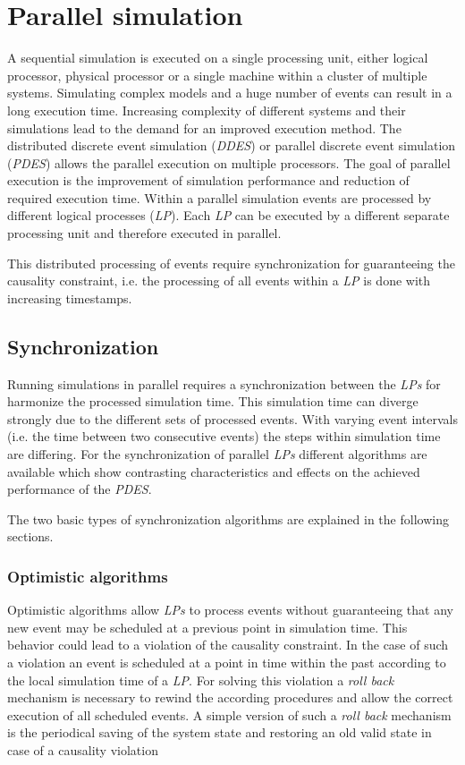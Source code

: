 \chapter{Parallel simulation}
\label{cha:parallel_sim}
A sequential simulation is executed on a single processing unit, either logical processor, physical processor or a single machine within a cluster of multiple systems.
Simulating complex models and a huge number of events can result in a long execution time.
Increasing complexity of different systems and their simulations lead to the demand for an improved execution method.
The distributed discrete event simulation (\emph{DDES}) or parallel discrete event simulation (\emph{PDES}) allows the parallel execution on multiple processors.
The goal of parallel execution is the improvement of simulation performance and reduction of required execution time.
Within a parallel simulation events are processed by different logical processes (\emph{LP}).
Each \emph{LP} can be executed by a different separate processing unit and therefore executed in parallel. \cite{bagrodia_parsec:_1998}

This distributed processing of events require synchronization for guaranteeing the causality constraint, i.e. the processing of all events within a \emph{LP} is done with increasing timestamps.

\section{Synchronization}
\label{sec:parallel_synchronization}
Running simulations in parallel requires a synchronization between the \emph{LPs} for harmonize the processed simulation time.
This simulation time can diverge strongly due to the different sets of processed events.
With varying event intervals (i.e. the time between two consecutive events) the steps within simulation time are differing.
For the synchronization of parallel \emph{LPs} different algorithms are available which show contrasting characteristics and effects on the achieved performance of the \emph{PDES}. \cite[chapter 2]{bagrodia_performance_2000}

The two basic types of synchronization algorithms are explained in the following sections.

\subsection{Optimistic algorithms}
\label{sec:parallel_synchronization_optimistic}
Optimistic algorithms allow \emph{LPs} to process events without guaranteeing that any new event may be scheduled at a previous point in simulation time.
This behavior could lead to a violation of the causality constraint.
In the case of such a violation an event is scheduled at a point in time within the past according to the local simulation time of a \emph{LP}.
For solving this violation a \emph{roll back} mechanism is necessary to rewind the according procedures and allow the correct execution of all scheduled events.
A simple version of such a \emph{roll back} mechanism is the periodical saving of the system state and restoring an old valid state in case of a causality violation \cite{bagrodia_parsec:_1998}
    

